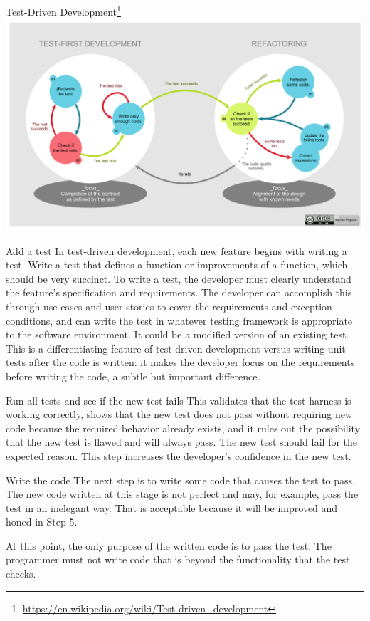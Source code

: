 \documentclass{beamer}
\begin{document}
\begin{frame}[t]{Test-Driven Development\footnote{\url{https://en.wikipedia.org/wiki/Test-driven_development}}}
    \includegraphics[width=0.8\linewidth]{images/TDD-Global-Lifecycle.png}
    
\end{frame}

\begin{frame}[t]{Add a test}
In test-driven development, each new feature begins with writing a test. Write a test that defines a function or improvements of a function, which should be very succinct. To write a test, the developer must clearly understand the feature's specification and requirements. The developer can accomplish this through use cases and user stories to cover the requirements and exception conditions, and can write the test in whatever testing framework is appropriate to the software environment. It could be a modified version of an existing test. This is a differentiating feature of test-driven development versus writing unit tests after the code is written: it makes the developer focus on the requirements before writing the code, a subtle but important difference.
    
\end{frame}


\begin{frame}[t]{Run all tests and see if the new test fails}
This validates that the test harness is working correctly, shows that the new test does not pass without requiring new code because the required behavior already exists, and it rules out the possibility that the new test is flawed and will always pass. The new test should fail for the expected reason. This step increases the developer's confidence in the new test.
    
\end{frame}

\begin{frame}[t]{Write the code}
The next step is to write some code that causes the test to pass. The new code written at this stage is not perfect and may, for example, pass the test in an inelegant way. That is acceptable because it will be improved and honed in Step 5.
    
At this point, the only purpose of the written code is to pass the test. The programmer must not write code that is beyond the functionality that the test checks.
\end{frame}
\end{document}
